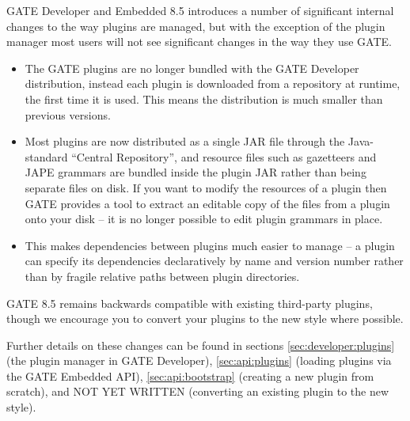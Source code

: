%
%
\ifnested
  \def\rcSectNoLabel#1{\subsect{#1}}
  \def\rcSect[#1]#2{\subsect[subsec:changes:#1]{#2}}
  \def\rcSubsect#1{\subsubsect{#1}}
  \def\rcSubsubsect#1{\subsubsubsect{#1}}
\else
  \def\rcSectNoLabel#1{\sect{#1}}
  \def\rcSect[#1]#2{\sect[sec:changes:#1]{#2}}
  \def\rcSubsect#1{\subsect{#1}}
  \def\rcSubsubsect#1{\subsubsect{#1}}
\fi

\rcSect[8.5]{Version 8.5 (May 2018)}

GATE Developer and Embedded 8.5 introduces a number of significant internal
changes to the way plugins are managed, but with the exception of the plugin
manager most users will not see significant changes in the way they use GATE.

\begin{itemize}
\item The GATE plugins are no longer bundled with the GATE Developer
  distribution, instead each plugin is downloaded from a repository at runtime,
  the first time it is used.  This means the distribution is much smaller than
  previous versions.
\item Most plugins are now distributed as a single JAR file through the
  Java-standard ``Central Repository'', and resource files such as gazetteers
  and JAPE grammars are bundled inside the plugin JAR rather than being
  separate files on disk.  If you want to modify the resources of a plugin
  then GATE provides a tool to extract an editable copy of the files from
  a plugin onto your disk -- it is no longer possible to edit plugin grammars
  in place.
\item This makes dependencies between plugins much easier to manage -- a plugin
  can specify its dependencies declaratively by name and version number rather
  than by fragile relative paths between plugin directories.
\end{itemize}

GATE 8.5 remains backwards compatible with existing third-party plugins, though
we encourage you to convert your plugins to the new style where possible.

Further details on these changes can be found in sections
\ref{sec:developer:plugins} (the plugin manager in GATE Developer),
\ref{sec:api:plugins} (loading plugins via the GATE Embedded API),
\ref{sec:api:bootstrap} (creating a new plugin from scratch), and NOT YET
WRITTEN (converting an existing plugin to the new style).

